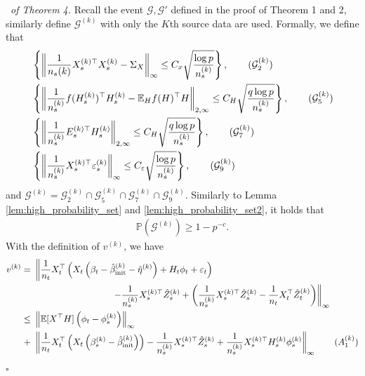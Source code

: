 \documentclass[12pt]{article}
\newenvironment{pf}{{\noindent \it Proof}\ }{\hfill $\square$\par}
\begin{document}
\begin{pf}{\it of Theorem 4. }
    Recall the event $\mathcal{G},\mathcal{G}'$ defined in the proof of Theorem 1 and 2, similarly define $\mathcal{G}^{(k)}$ with only the $K$th source data are used. Formally, we define that 
    \begin{align}
        &\left\{\left\|\frac{1}{n_s{(k)}} X_s^{(k)\top}X_s^{(k)} - \Sigma_X\right\|_{\infty} \le C_x\sqrt{\frac{\log p}{n_s^{(k)}}}\right\},\label{set:g_2_k}\tag{$\mathcal{G}_2^{(k)}$} \\&
        \left\{\left\|\frac{1}{n_s^{(k)}}f(H_s^{(k)})^\top H_s^{(k)} - \mathbb{E}_{H} f(H)^\top H \right\|_{2,\infty} \le
        C_{H} \sqrt{\frac{q \log p}{n_s^{(k)}}}\right\},\label{set:g_5_k}\tag{$\mathcal{G}_5^{(k)}$}\\& 
        \left\{\left\| \frac{1}{n_s^{(k)}} E_s^{(k)\top} H_s^{(k)}\right\|_{2,\infty} \le C_H\sqrt{\frac{q\log p}{n_s^{(k)}}}\right\}, \label{set:g_7_k}\tag{$\mathcal{G}_7^{(k)}$}\\&
        \left\{\left\|\frac{1}{n_s^{(k)}} X_s^{(k)\top} \varepsilon_s^{(k)}\right\|_{\infty} \le C_\varepsilon \sqrt{\frac{\log p}{n_s^{(k)}}}\right\}, \label{set:g_9_k}\tag{$\mathcal{G}_9^{(k)}$}
    \end{align}
    and $\mathcal{G}^{(k)} = \mathcal{G}_2^{(k)}\cap\mathcal{G}_5^{(k)}\cap\mathcal{G}_7^{(k)}\cap\mathcal{G}_9^{(k)}$. Similarly to Lemma \ref{lem:high_probability_set} and \ref{lem:high_probability_set2}, it holds that 
    \begin{align*}
    \mathbb{P}\left(\mathcal{G}^{(k)} \right) \ge 1 - p^{-c}.     
    \end{align*}
    With the definition of $v^{(k)}$, we have 
    \begin{align}
        v^{(k)}=\ &  \left\|\frac{1}{n_t}X_t^\top\left(X_t\left(\beta_t - \hat{\beta}_{\text{init}}^{(k)} - \hat{\eta}^{(k)}\right)+H_t\phi_t+\varepsilon_t\right) \right.\notag\\ & \hspace{3cm}\left.- \frac{1}{n_s^{(k)}}X_s^{(k)\top}\hat{Z}_s^{(k)}+ \left(\frac{1}{n_s^{(k)}}X_s^{(k)\top}\hat{Z}_s^{(k)} - \frac{1}{n_t}X_t^\top \hat{Z}^{(k)}_t \right)\right\|_{\infty}\notag\\ \le\ & 
        \left\| \mathbb{E}[X^\top H]\left(\phi_t -\phi_s^{(k)}\right)\right\|_{\infty} \notag
                \\ + \ &
        \left\|\frac{1}{n_t}X_t^\top\left(X_t\left(\beta_s^{(k)} - \hat{\beta}_{\text{init}}^{(k)}\right)\right) - \frac{1}{n_s^{(k)}}X_s^{(k)\top}\hat{Z}_s^{(k)}+ \frac{1}{n_s^{(k)}} X_s^{(k)\top}H_s^{(k)}\phi_s^{(k)}\right\|_{\infty}\label{term:A_1_k} \tag{$A_1^{(k)}$}

\end{align}
\end{pf}
\end{document}
